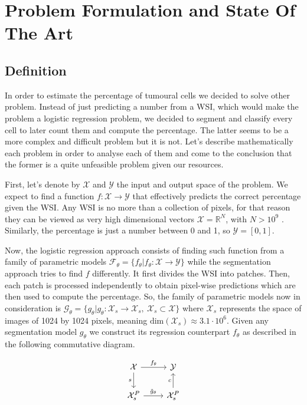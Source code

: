 \chapter{Problem Formulation and State Of The Art}

\section{Definition}

In order to estimate the percentage of tumoural cells we decided to solve other problem. Instead of just predicting a number from a WSI, which would make the problem a logistic regression problem, we decided to segment and classify every cell to later count them and compute the percentage. The latter seems to be a more complex and difficult problem but it is not. Let's describe mathematically each problem in order to analyse each of them and come to the conclusion that the former is a quite unfeasible problem given our resources.

First, let's denote by $\mathcal{X}$ and $\mathcal{Y}$ the input and output space of the problem. We expect to find a function $f : \mathcal{X} \to \mathcal{Y}$ that effectively predicts the correct percentage given the WSI. Any WSI is no more than a collection of pixels, for that reason they can be viewed as very high dimensional vectors $\mathcal{X} = \mathbb{R}^N$, with $N > 10^{9}$ \cite{DICOM}. Similarly, the percentage is just a number between 0 and 1, so $\mathcal{Y} = [0,1]$.

Now, the logistic regression approach consists of finding such function from a family of parametric models $\mathcal{F}_\theta = \{ f_\theta | f_\theta : \mathcal{X} \to \mathcal{Y} \}$ while the segmentation approach tries to find $f$ differently. It first divides the WSI into patches. Then, each patch is processed independently to obtain pixel-wise predictions which are then used to compute the percentage. So, the family of parametric models now in consideration is $\mathcal{G}_\theta = \{ g_\theta | g_\theta : \mathcal{X}_s \to \mathcal{X}_s,\ \mathcal{X}_s \subset \mathcal{X} \}$ where $\mathcal{X}_s$ represents the space of images of 1024 by 1024 pixels, meaning $\text{dim}(\mathcal{X}_s) \approx 3.1 \cdot 10^6$. Given any segmentation model $g_\theta$ we construct its regression counterpart $f_\theta$ as described in the following commutative diagram. 

\[ \begin{tikzcd}
\mathcal{X} \arrow{r}{f_\theta} \arrow[swap]{d}{s} & \mathcal{Y} \\%
\mathcal{X}_s^P \arrow{r}{\tilde{g}_\theta}& \mathcal{X}_s^P \arrow{u}{c}
\end{tikzcd}
\]

